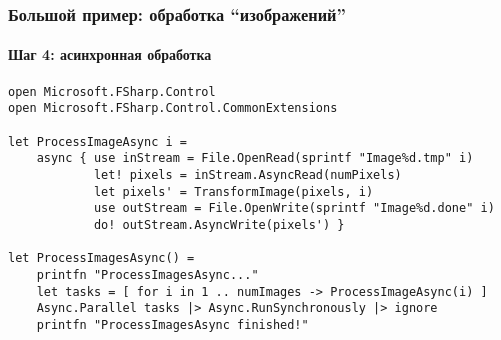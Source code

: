 \documentclass[xetex,mathserif,serif]{beamer}
\begin{document}
	\begin{frame}[fragile]
		\frametitle{Большой пример: обработка ``изображений''}
		\framesubtitle{Шаг 4: асинхронная обработка}
		\begin{footnotesize}
			\begin{verbatim}
open Microsoft.FSharp.Control
open Microsoft.FSharp.Control.CommonExtensions

let ProcessImageAsync i =
    async { use inStream = File.OpenRead(sprintf "Image%d.tmp" i)
            let! pixels = inStream.AsyncRead(numPixels)
            let pixels' = TransformImage(pixels, i)
            use outStream = File.OpenWrite(sprintf "Image%d.done" i)
            do! outStream.AsyncWrite(pixels') }

let ProcessImagesAsync() =
    printfn "ProcessImagesAsync..."
    let tasks = [ for i in 1 .. numImages -> ProcessImageAsync(i) ]
    Async.Parallel tasks |> Async.RunSynchronously |> ignore
    printfn "ProcessImagesAsync finished!"
			\end{verbatim}
		\end{footnotesize}
	\end{frame}
\end{document}

